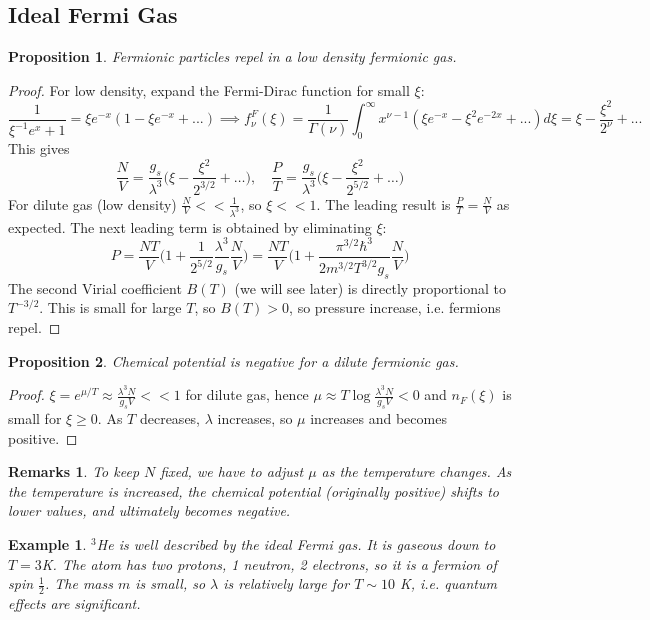\documentclass[a4paper]{article}
\newtheorem{eg}{Example}[section]
\newtheorem{remarks}{Remarks}[section]
\theoremstyle{new}
\newtheorem{prop}{Proposition}[section]
\begin{document}
\subsection{Ideal Fermi Gas}
\begin{prop}
Fermionic particles repel in a low density fermionic gas.
\end{prop}
\begin{proof}
For low density, expand the Fermi-Dirac function for small $\xi$:
$$\frac{1}{\xi^{-1}e^x+1}=\xi e^{-x}(1-\xi e^{-x}+...)\implies f_\nu^F(\xi)=\frac{1}{\Gamma(\nu)}\int_0^\infty x^{\nu-1}(\xi e^{-x}-\xi^2e^{-2x}+...)d\xi=\xi-\frac{\xi^2}{2^\nu}+...$$
This gives
$$\frac{N}{V}=\frac{g_s}{\lambda^3}\bigg(\xi-\frac{\xi^2}{2^{3/2}}+\dots\bigg),\quad\frac{P}{T}=\frac{g_s}{\lambda^3}\bigg(\xi-\frac{\xi^2}{2^{5/2}}+\dots\bigg)$$
For dilute gas (low density) $\frac{N}{V}<<\frac{1}{\lambda^3}$, so $\xi<<1$. The leading result is $\frac{P}{T}=\frac{N}{V}$ as expected. The next leading term is obtained by eliminating $\xi$:
$$P=\frac{NT}{V}\bigg(1+\frac{1}{2^{5/2}}\frac{\lambda^3}{g_s}\frac{N}{V}\bigg)=\frac{NT}{V}\bigg(1+\frac{\pi^{3/2}\hbar^3}{2m^{3/2}T^{3/2}g_s}\frac{N}{V}\bigg)$$
The second Virial coefficient $B(T)$ (we will see later) is directly proportional to $T^{-3/2}$. This is small for large $T$, so $B(T)>0$, so pressure increase, i.e. fermions repel.
\end{proof}
\begin{prop}
Chemical potential is negative for a dilute fermionic gas.
\end{prop}
\begin{proof}
$\xi=e^{\mu/T}\approx\frac{\lambda^3N}{g_sV}<<1$ for dilute gas, hence $\mu\approx T\log\frac{\lambda^3N}{g_sV}<0$ and $n_F(\xi)$ is small for $\xi\geq0$. As $T$ decreases, $\lambda$ increases, so $\mu$ increases and becomes positive. 
\end{proof}
\begin{remarks}
To keep $N$ fixed, we have to adjust $\mu$ as the temperature changes. As the temperature is increased, the chemical potential (originally positive) shifts to lower values, and ultimately becomes negative.
\end{remarks}
\begin{eg}
$^3$He is well described by the ideal Fermi gas. It is gaseous down to $T=3$K. The atom has two protons, 1 neutron, 2 electrons, so it is a fermion of spin $\frac{1}{2}$. The mass $m$ is small, so $\lambda$ is relatively large for $T\sim 10$ K, i.e. quantum effects are significant.
\end{eg}
\end{document}
